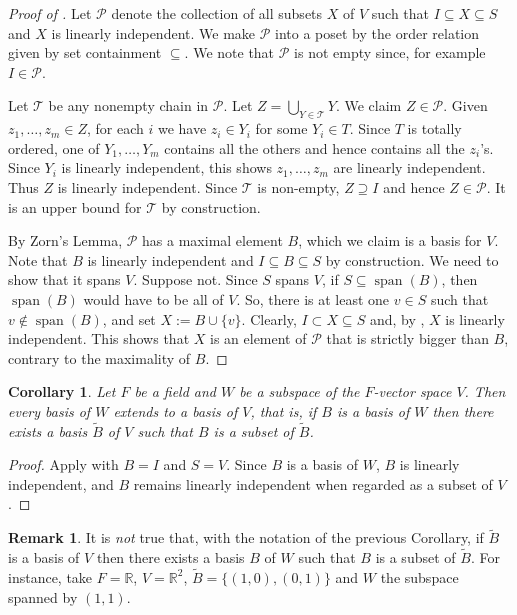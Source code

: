 \documentclass[12pt]{report}
\newtheorem{corollary}[theorem]{Corollary}
\numberwithin{equation}{section}
\numberwithin{theorem}{chapter}
\theoremstyle{definition}
\newtheorem*{basic properties}{Basic Properties}
\newtheorem*{Important Remark}{Important Remark}
\newtheorem{remark}[theorem]{Remark}
\DeclareMathOperator{\Span}{span}
\newcommand{\cP}{\mathcal{P}}
\newcommand{\cT}{\mathcal{T}}
\begin{document}
\begin{proof}[Proof of ]
Let $\cP$ denote the collection of all subsets $X$ of $V$ such that $I \subseteq X \subseteq S$ and $X$ is linearly independent. We make $\cP$ into a poset by the order relation given by set containment $\subseteq$. We note that $\cP$ is not empty since, for example $I \in \cP$. 

Let $\cT$ be any nonempty chain in $\cP$. Let $Z = \bigcup_{Y \in \cT} Y$. We claim $Z \in \cP$. Given  $z_1, \dots, z_m \in Z$, for each $i$ we have $z_i \in Y_i$ for some $Y_i \in T$. Since $T$ is totally ordered, one of $Y_1, \dots, Y_m$ contains all the others and hence contains all the $z_i$'s. 
Since $Y_i$ is linearly independent, this shows $z_1, \dots, z_m$ are linearly independent. Thus $Z$ is linearly independent. Since $\cT$ is non-empty, $Z \supseteq I$ and hence $Z \in \cP$. It is an upper bound for $\cT$ by construction. 

By Zorn's Lemma, $\cP$ has a maximal element $B$, which we claim is a basis for $V$. Note that $B$ is linearly independent and  $I \subseteq B \subseteq S$ by construction. We need to show that it spans $V$. Suppose not. Since $S$ spans $V$, if $S \subseteq \Span(B)$, then $\Span(B)$ would have to be all of $V$. So, there is at least one $v \in S$ such that $v \notin \Span(B)$, and set $X := B \cup \{v\}$.
Clearly, $I \subset X \subseteq S$ and, by , $X$ is linearly independent. This shows that $X$ is an element of $\cP$ that is strictly bigger than $B$, contrary to the maximality of $B$. 
\end{proof}




\begin{corollary}
Let $F$ be a field and $W$ be a subspace of the $F$-vector space $V$. Then every basis of $W$ extends to a basis of $V$, that is, if $B$ is a basis of $W$ then there exists a basis $\tilde{B}$ of $V$ such that $B$ is a subset of $\tilde{B}$.
\end{corollary}

\begin{proof} 
Apply  with $B = I$ and $S = V$. Since $B$ is a basis of $W$, $B$ is linearly independent, and  $B$ remains linearly independent when regarded as a subset of $V$.
\end{proof}

\begin{remark} 
It is {\em not} true that, with the notation of the previous Corollary, if $\tilde{B}$ is a basis of $V$ then there exists a basis $B$ of $W$ such that $B$ is a subset of $\tilde{B}$. For instance, take $F = \mathbb{R}$, $V = \mathbb{R}^2$, $\tilde{B} = \{(1,0), (0,1)\}$ and $W$ the subspace spanned by $(1,1)$. 
  \end{remark}
\end{document}

